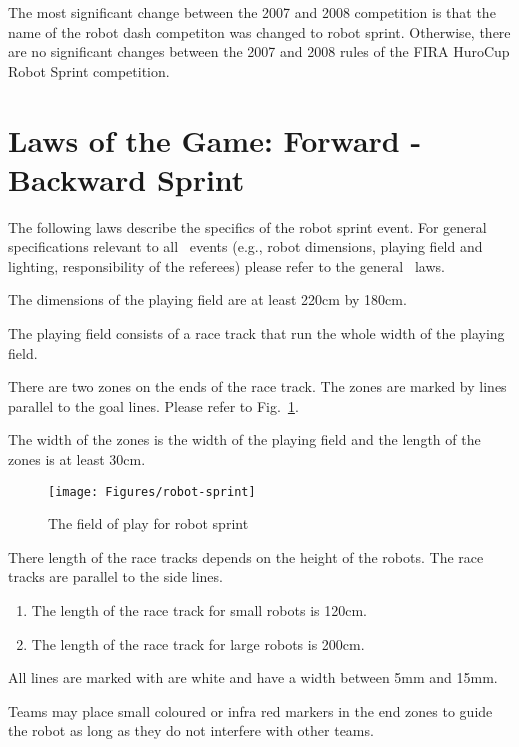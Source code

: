 \documentclass[12pt]{hurocup}
\begin{document}
The most significant change between the 2007 and 2008 competition is
that the name of the robot dash competiton was changed to robot
sprint. Otherwise, there are no significant changes between the 2007
and 2008 rules of the FIRA HuroCup Robot Sprint competition.

\section{Laws of the Game: Forward - Backward Sprint}
\label{sec:laws-forward-backward-sprint}

The following laws describe the specifics of the robot sprint event. For
general specifications relevant to all \HuroCup\ events (e.g., robot
dimensions, playing field and lighting, responsibility of the
referees) please refer to the general \HuroCup\ laws.

\label{law:field-of-play}

\begin{lawlist}[RD]

\item The dimensions of the playing field are at least 220cm by
  180cm. 
  
\item The playing field consists of a race track that run the whole
  width of the playing field.

\item There are two zones on the ends of the race track. The zones are
  marked by lines parallel to the goal lines. Please refer to
  Fig.~\ref{fig:robot-sprint}.

\item The width of the zones is the width of the playing field and the
  length of the zones is at least 30cm.
  \begin{figure}
    \begin{center}
      \texttt{[image: Figures/robot-sprint]}
    \end{center}
    \caption{The field of play for robot sprint}
    \label{fig:robot-sprint}
  \end{figure}
  
\item There length of the race tracks depends on the height of the
  robots. The race tracks are parallel to the side lines.
  \begin{enumerate}
  \item The length of the race track for small robots
    is 120cm.
  \item The length of the race track for large robots
    is 200cm.
  \end{enumerate}

\item All lines are marked with are white and have a width between 5mm
  and 15mm.
  
\item Teams may place small coloured or infra red markers in the end
  zones to guide the robot as long as they do not interfere with other
  teams.
\end{lawlist}
\end{document}
